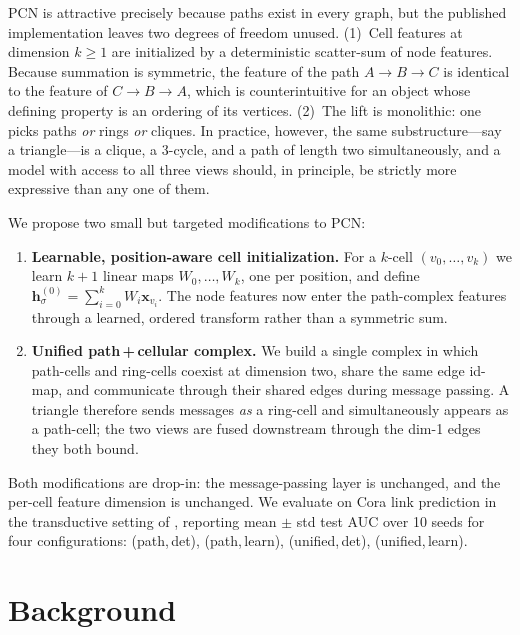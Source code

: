 \documentclass[11pt]{article}
\newcommand{\pcn}{\textsc{PCN}}
\begin{document}
\pcn{} \citep{truong2024pcn} is attractive precisely because paths
exist in every graph, but the published implementation leaves two
degrees of freedom unused. (1)~Cell features at dimension $k\ge1$ are
initialized by a deterministic scatter-sum of node features. Because
summation is symmetric, the feature of the path $A{\to}B{\to}C$ is
identical to the feature of $C{\to}B{\to}A$, which is counterintuitive
for an object whose defining property is an ordering of its vertices.
(2)~The lift is monolithic: one picks paths \emph{or} rings \emph{or}
cliques. In practice, however, the same substructure---say a
triangle---is a clique, a 3-cycle, and a path of length two
simultaneously, and a model with access to all three views should, in
principle, be strictly more expressive than any one of them.

We propose two small but targeted modifications to \pcn{}:

\begin{enumerate}
  \item \textbf{Learnable, position-aware cell initialization.}
    For a $k$-cell $(v_0,\ldots,v_k)$ we learn $k{+}1$ linear
    maps $W_0,\ldots,W_k$, one per position, and define
    $\mathbf{h}^{(0)}_{\sigma} = \sum_{i=0}^{k} W_i\mathbf{x}_{v_i}$.
    The node features now enter the path-complex features through
    a learned, ordered transform rather than a symmetric sum.
  \item \textbf{Unified path\,+\,cellular complex.}
    We build a single complex in which path-cells and ring-cells
    coexist at dimension two, share the same edge id-map, and
    communicate through their shared edges during message passing.
    A triangle therefore sends messages \emph{as} a ring-cell and
    simultaneously appears as a path-cell; the two views are
    fused downstream through the dim-1 edges they both bound.
\end{enumerate}

Both modifications are drop-in: the message-passing layer is unchanged,
and the per-cell feature dimension is unchanged. We evaluate on Cora
link prediction in the transductive setting of
\citet{kipf2016variational}, reporting mean $\pm$ std test AUC over
10 seeds for four configurations: (path,\,det), (path,\,learn),
(unified,\,det), (unified,\,learn).

\section{Background}
\end{document}
